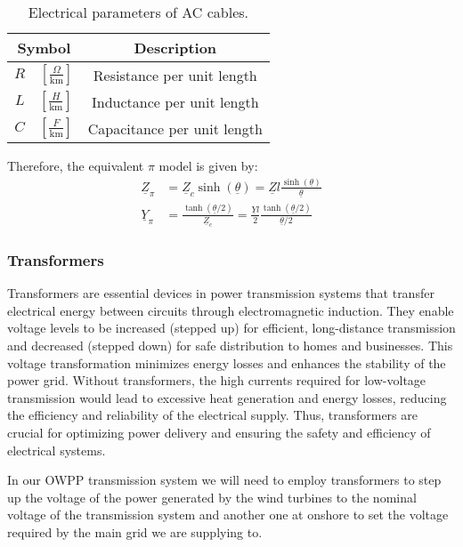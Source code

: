 \documentclass[a4paper,11pt, titlepage, twoside]{article}
\begin{document}

\begin{table}[h]
\centering
\begin{tabular}{|c|c|}
\hline
Symbol & Description \\
\hline
$R \quad \left[\frac{\Omega}{\text{km}}\right]$  & Resistance per unit length \\
$L \quad \left[\frac{H}{\text{km}}\right]$ & Inductance per unit length \\
$C \quad \left[\frac{F}{\text{km}}\right]$ & Capacitance per unit length \\
\hline
\end{tabular}
\caption{Electrical parameters of AC cables.}
\label{tab:parameters}
\end{table} 



Therefore, the equivalent $\pi$ model is given by:
\begin{align}
\underline{Z}_{\pi} &= \underline{Z}_c \sinh(\underline{\theta}) = \underline{Z} l \frac{\sinh(\underline{\theta})}{\underline{\theta}} \\
\underline{Y}_{\pi} &= \frac{\tanh(\underline{\theta}/2)}{\underline{Z}_c} = \frac{\underline{Y} l}{2} \frac{\tanh(\underline{\theta}/2)}{\underline{\theta}/2}
\end{align}

\subsubsection{Transformers}
Transformers are essential devices in power transmission systems that transfer electrical energy between circuits through electromagnetic induction.
They enable voltage levels to be increased (stepped up) for efficient, long-distance transmission and decreased (stepped down) for safe distribution to homes and businesses.
This voltage transformation minimizes energy losses and enhances the stability of the power grid. Without transformers, the high currents required for low-voltage transmission would lead to excessive heat generation and energy losses,
reducing the efficiency and reliability of the electrical supply. Thus, transformers are crucial for optimizing power delivery and ensuring the safety and efficiency of electrical systems.

In our OWPP transmission system we will need to employ transformers to step up the voltage of the power generated by the wind turbines to the nominal voltage of the transmission system and another one at onshore to set
the voltage required by the main grid we are supplying to.
\end{document}
